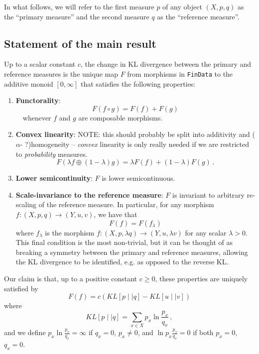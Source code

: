 \documentclass{article}
\begin{document}
In what follows, we will refer to the first measure $p$ of any object $(X, p, q)$ as the ``primary measure'' and the second measure $q$ as the ``reference measure''.

\subsection{Statement of the main result}
Up to a scalar constant $c$, the change in KL divergence between the primary and reference measures is the unique map $F$ from morphisms in \texttt{FinData} to the additive monoid $[0, \infty]$ that satisfies the following properties:
\begin{enumerate}
    \item \textbf{Functorality}:
      $$
      F(f \circ g) = F(f) + F(g)
      $$
      $\quad$whenever $f$ and $g$ are composable morphisms.
      
    \item \textbf{Convex linearity}: NOTE: this should probably be split into additivity and ($\alpha$- ?)homogeneity  -- \textit{convex} linearity is only really needed if we are restricted to \textit{probability} measures.
      $$
        F(\lambda f \oplus (1-\lambda)g) = \lambda F(f) + (1 - \lambda)F(g)\,.
      $$
    \item \textbf{Lower semicontinuity}: $F$ is lower semicontinuous.
    \item \textbf{Scale-invariance to the reference measure}: $F$ is invariant to arbitrary re-scaling of the reference measure. In particular, for any morphism $f:(X, p, q) \rightarrow (Y, u, v)$, we have that 
      $$
        F(f) = F(f_\lambda)
      $$
    where $f_\lambda$ is the morphism $f:(X, p, \lambda q) \rightarrow (Y, u, \lambda v)$ for any scalar $\lambda > 0$. This final condition is the most non-trivial, but it can be thought of as breaking a symmetry between the primary and reference measures, allowing the KL divergence to be identified, e.g. as opposed to the reverse KL.
\end{enumerate}

Our claim is that, up to a positive constant $c \geq 0$, these properties are uniquely satisfied by 
\begin{equation} \label{claim}
    F(f) = c(KL[p \mid\mid q] - KL[u \mid\mid v])
\end{equation}
where
$$
 KL[p \mid\mid q] = \sum_{x\in X} p_x \ln \frac{p_x}{q_x}\,,
$$
and we define $p_x\ln \frac{p_x}{q_x} = \infty$ if $q_x = 0$, $p_x\neq 0$, and $\ln p_x\frac{p_x}{q_x} = 0$ if both $p_x = 0$, $q_x = 0$.
\end{document}
